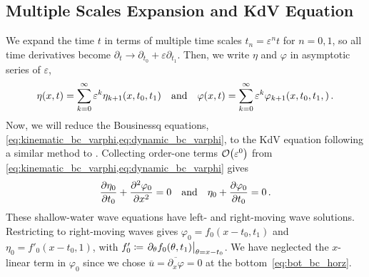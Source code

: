 \documentclass{jfm}
\renewcommand*{\epsilon}{\varepsilon}
\begin{document}
\subsection{\label{sec:shallow_water} Multiple Scales Expansion and KdV
Equation}
We expand the time $t$ in terms of multiple time scales $t_n =
\epsilon^n t$ for $n= 0,1$, so all time derivatives become $\partial_t \to
\partial_{t_0} + \epsilon \partial_{t_1}$.
Then, we write $\eta$ and $\varphi$ in asymptotic series of $\epsilon$,
\begin{equation}
  \eta(x,t) = \sum_{k=0}^{\infty} \epsilon^k
    \eta_{k+1}(x,t_0,t_1) \qq{and}
  \varphi(x,t) = \sum_{k=0}^{\infty} \epsilon^k
    \varphi_{k+1}(x,t_0,t_1,) \,.
\end{equation}
Now, we will reduce the Bousinessq equations,
\cref{eq:kinematic_bc_varphi,eq:dynamic_bc_varphi}, to the KdV equation
following a similar method to \citet{mei2005nonlinear}.
Collecting order-one terms $\order{\epsilon^0}$ from
\cref{eq:kinematic_bc_varphi,eq:dynamic_bc_varphi} gives
\begin{equation}
  \pdv{\eta_0}{t_0} + \pdv[2]{\varphi_0}{x} = 0 \qq{and}
  \eta_0 + \pdv{\varphi_0}{t_0} = 0 \,.
\end{equation}
These shallow-water wave equations have left- and right-moving wave
solutions.
Restricting to right-moving waves gives $\varphi_0 = f_0(x-t_0,t_1)$ and
$\eta_0 = f'_0(x-t_0,1)$, with $f_0' \coloneqq \eval{\partial_{\theta}
f_0(\theta,t_1)}_{\theta = x-t_0}$.
We have neglected the $x$-linear term in $\varphi_0$ since we chose
$\overline{u} = \overline{\partial_x \varphi} = 0$ at the
bottom~\cref{eq:bot_bc_horz}.
\end{document}
